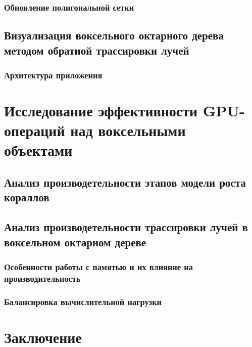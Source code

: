 \documentclass[a4paper,14pt]{extreport}
\begin{document}
\subsection{Обновление полигональной сетки}
\section{Визуализация воксельного октарного дерева методом обратной трассировки лучей}
\subsection{Архитектура приложения}

\chapter{Исследование эффективности GPU-операций над воксельными объектами}
\section{Анализ производетельности этапов модели роста кораллов}
\section{Анализ производетельности трассировки лучей в воксельном октарном дереве}
\subsection{Особенности работы с памятью и их влияние на производительность}
\subsection{Балансировка вычислительной нагрузки}

\chapter*{Заключение}

\begin{thebibliography}{99}

\end{thebibliography}



%

%
%
%
%




\end{document}
